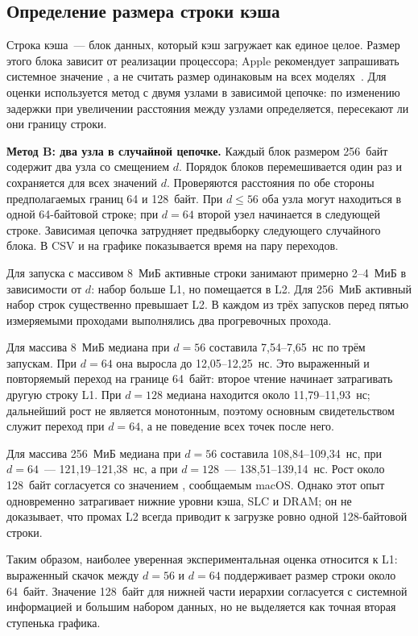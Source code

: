 \subsection{Определение размера строки кэша}

Строка кэша~--- блок данных, который кэш загружает как единое целое. Размер этого блока зависит от реализации процессора; Apple рекомендует запрашивать системное значение , а не считать размер одинаковым на всех моделях~\cite{apple-sysctl,apple-arch}. Для оценки используется метод с двумя узлами в зависимой цепочке: по изменению задержки при увеличении расстояния между узлами определяется, пересекают ли они границу строки.

\textbf{Метод B: два узла в случайной цепочке.} Каждый блок размером 256~байт содержит два узла со смещением $d$. Порядок блоков перемешивается один раз и сохраняется для всех значений $d$. Проверяются расстояния по обе стороны предполагаемых границ 64 и 128~байт. При $d\le56$ оба узла могут находиться в одной 64-байтовой строке; при $d=64$ второй узел начинается в следующей строке. Зависимая цепочка затрудняет предвыборку следующего случайного блока. В CSV и на графике показывается время на пару переходов.

Для запуска с массивом 8~МиБ активные строки занимают примерно 2--4~МиБ в зависимости от $d$: набор больше L1, но помещается в L2. Для 256~МиБ активный набор строк существенно превышает L2. В каждом из трёх запусков перед пятью измеряемыми проходами выполнялись два прогревочных прохода.



Для массива 8~МиБ медиана при $d=56$ составила 7,54--7,65~нс по трём запускам. При $d=64$ она выросла до 12,05--12,25~нс. Это выраженный и повторяемый переход на границе 64~байт: второе чтение начинает затрагивать другую строку L1. При $d=128$ медиана находится около 11,79--11,93~нс; дальнейший рост не является монотонным, поэтому основным свидетельством служит переход при $d=64$, а не поведение всех точек после него.

Для массива 256~МиБ медиана при $d=56$ составила 108,84--109,34~нс, при $d=64$~--- 121,19--121,38~нс, а при $d=128$~--- 138,51--139,14~нс. Рост около 128~байт согласуется со значением , сообщаемым macOS. Однако этот опыт одновременно затрагивает нижние уровни кэша, SLC и DRAM; он не доказывает, что промах L2 всегда приводит к загрузке ровно одной 128-байтовой строки.

Таким образом, наиболее уверенная экспериментальная оценка относится к L1: выраженный скачок между $d=56$ и $d=64$ поддерживает размер строки около 64~байт. Значение 128~байт для нижней части иерархии согласуется с системной информацией и большим набором данных, но не выделяется как точная вторая ступенька графика.
